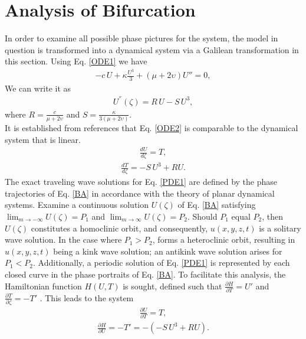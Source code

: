 \documentclass[10pt]{NSP1}
\numberwithin{equation}{section}
\begin{document}
\section{Analysis of Bifurcation}
In order to examine all possible phase pictures for the system, the model in question is transformed into a dynamical system via a Galilean transformation in this section. Using Eq. \ref{ODE1} we have
\begin{eqnarray}
 -c\,U+\kappa \frac{U^3}{3}+ (\mu+2\upsilon)U''=0,
\end{eqnarray}
We can write it as
\begin{eqnarray}\label{ODE2}
U^{''}{(\zeta)}=R\,U-S\,U^3,
\end{eqnarray}
where $R=\frac{c}{\mu+2\upsilon}$ and $S= \frac{\kappa}{3(\mu+2\upsilon)}$.\\
It is established from references \cite{b44,b45} that Eq. \ref{ODE2} is comparable to the dynamical system that is linear.\\
\begin{eqnarray}\label{BA}
\frac{d U}{d \zeta} = T,\nonumber
\end{eqnarray}
\begin{eqnarray}
\frac{d T}{d \zeta} = -S \,U^{3}+R U.
\end{eqnarray}
The exact traveling wave solutions for Eq. \ref{PDE1} are defined by the phase trajectories of Eq. \ref{BA} in accordance with the theory of planar dynamical systems. Examine a continuous solution $U(\zeta)$ of Eq. \ref{BA} satisfying ${\lim_{m\longrightarrow-\infty}U(\zeta)=P_{1}}$ and ${\lim_{m\longrightarrow\infty}U(\zeta)=P_{2}}$. Should $P_{1}$ equal $P_{2}$, then $U(\zeta)$ constitutes a homoclinic orbit, and consequently, $u(x,y,z, t)$ is a solitary wave solution. In the case where $P_{1} > P_{2}$,  forms a heteroclinic orbit, resulting in $u(x,y,z, t)$ being a kink wave solution; an antikink wave solution arises for  $P_{1} < P_{2}$. Additionally, a periodic solution of Eq. \ref{PDE1} is represented by each closed curve in the phase portraits of Eq. \ref{BA}. To facilitate this analysis, the Hamiltonian function $H(U, T)$ is sought, defined such that $\frac{\partial H}{\partial T} = \mathit{U'}$  and $\frac{\partial T}{\partial \zeta} = -\mathit{T'}$ . This leads to the system
\begin{eqnarray}
\frac{\partial U}{\partial T} = T,\nonumber
\end{eqnarray}
\begin{eqnarray}
\frac{\partial H}{\partial U} =-T'= -(-S \,U^{3}+R U).
\end{eqnarray}
\end{document}
